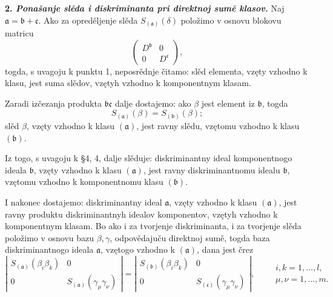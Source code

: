 \documentclass[11pt]{article}
\begin{document}
\setcounter{footnote}{26}

\textbf{2. \emph{Ponašanje slěda i diskriminanta pri direktnoj sumě klasov.}} Naj $\mathfrak a=\mathfrak b+\mathfrak c$. Ako za opreděljenje slěda $S_{(\mathfrak a)}(\delta)$ položimo v osnovu blokovu matricu
\[
        \begin{pmatrix}D^{\mathfrak b}&0\\0&D^{\mathfrak c}\end{pmatrix},
\]
togda, s uvagoju k punktu 1, neposrědnje čitamo: slěd elementa, vzęty vzhodno k klasu, jest suma slědov, vzętyh vzhodno k komponentnym klasam.

Zaradi izčezanja produkta $\mathfrak b\mathfrak c$ dalje dostajemo: ako $\beta$ jest element iz $\mathfrak b$, togda
\[
        S_{(\mathfrak a)}(\beta)=S_{(\mathfrak b)}(\beta);
\]
slěd $\beta$, vzęty vzhodno k klasu $(\mathfrak a)$, jest ravny slědu, vzętomu vzhodno k klasu $(\mathfrak b)$.

Iz togo, s uvagoju k §4, 4, dalje slěduje: diskriminantny ideal komponentnogo ideala $\mathfrak b$, vzęty vzhodno k klasu $(\mathfrak a)$, jest ravny diskriminantnomu idealu $\mathfrak b$, vzętomu vzhodno k komponentnomu klasu $(\mathfrak b)$.

I nakonec dostajemo: diskriminantny ideal $\mathfrak a$, vzęty vzhodno k klasu $(\mathfrak a)$, jest ravny produktu diskriminantnyh idealov komponentov, vzętyh vzhodno k komponentnym klasam. Bo ako i za tvorjenje diskriminanta, i za tvorjenje slěda položimo v osnovu bazu $\beta,\gamma$, odpovědajuču direktnoj sumě, togda baza diskriminantnogo ideala $\mathfrak a$, vzętogo vzhodno k $(\mathfrak a)$, dana jest črez
\[
\left|
\begin{array}{cc}
S_{(\mathfrak a)}(\beta_i\beta_k)&0\\
0&S_{(\mathfrak a)}(\gamma_\mu\gamma_\nu)
\end{array}
\right|
=
\left|
\begin{array}{cc}
S_{(\mathfrak b)}(\beta_i\beta_k)&0\\
0&S_{(\mathfrak c)}(\gamma_\mu\gamma_\nu)
\end{array}
\right|,
\qquad
\begin{matrix}
 i,k=1,\ldots,l,\\
 \mu,\nu=1,\ldots,m.
\end{matrix}
\]
\end{document}
